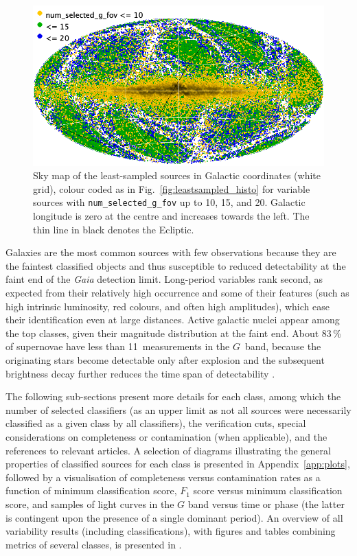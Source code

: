 \documentclass[longauth]{aa}
\def\gaia{\textit{Gaia}\xspace}
\def\g{$G$\xspace}
\begin{document}
\begin{figure}[t]
\centering
 \includegraphics[width=\hsize]{figures/least_sampled_sky.png}
 \caption{Sky map of the least-sampled sources in Galactic coordinates (white grid), colour coded as in Fig.~\ref{fig:leastsampled_histo} for variable sources with \texttt{num\_selected\_g\_fov} up to 10, 15, and 20. Galactic longitude is zero at the centre and increases towards the left. The thin line in black denotes the Ecliptic.}
 \label{fig:leastsampled_sky}
\end{figure}

Galaxies are the most common sources with few observations because they are the faintest classified objects and thus susceptible to reduced detectability at the faint end of the \gaia detection limit. Long-period variables rank second, as expected from their relatively high occurrence and some of their features (such as high intrinsic luminosity, red colours, and often high amplitudes), which ease their identification even at large distances. Active galactic nuclei appear among the top classes, given their magnitude distribution at the faint end. About 83\,\% of supernovae have less than 11~measurements in the \g~band, because the originating stars become detectable only after explosion and the subsequent brightness decay further reduces the time span of detectability \citep[for the distribution of the time intervals of \gaia observations, see appendix~A.4.3 in][]{2017arXiv170203295E}.

The following sub-sections present more details for each class, among which the number of selected classifiers (as an upper limit as not all sources were necessarily classified as a given class by all classifiers), the verification cuts, special considerations on completeness or contamination (when applicable), and the references to relevant articles. A selection of diagrams illustrating the general properties of classified sources for each class is presented in Appendix~\ref{app:plots}, followed by a visualisation of completeness versus contamination rates as a function of minimum classification score, $F_1$ score versus minimum classification score, and samples of light curves in the \g band versus time or phase (the latter is contingent upon the presence of a single dominant period).
An overview of all variability results (including classifications), with figures and tables combining metrics of several classes, is presented in \citet{DR3-DPACP-162}. 
\end{document}
